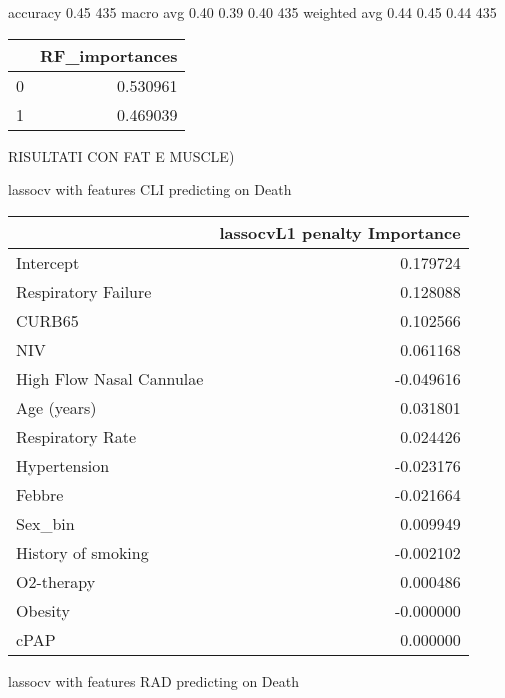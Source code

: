     accuracy                           0.45       435
   macro avg       0.40      0.39      0.40       435
weighted avg       0.44      0.45      0.44       435

\begin{tabular}{lr}
\toprule
{} &  RF\_importances \\
\midrule
0 &        0.530961 \\
1 &        0.469039 \\
\bottomrule
\end{tabular}

\large{RISULTATI CON FAT E MUSCLE)

lassocv with features CLI predicting on Death

\begin{tabular}{lr}
\toprule
{} &  lassocvL1 penalty Importance \\
\midrule
Intercept                &                      0.179724 \\
Respiratory Failure      &                      0.128088 \\
CURB65                   &                      0.102566 \\
NIV                      &                      0.061168 \\
High Flow Nasal Cannulae &                     -0.049616 \\
Age (years)              &                      0.031801 \\
Respiratory Rate         &                      0.024426 \\
Hypertension             &                     -0.023176 \\
Febbre                   &                     -0.021664 \\
Sex\_bin                  &                      0.009949 \\
History of smoking       &                     -0.002102 \\
O2-therapy               &                      0.000486 \\
Obesity                  &                     -0.000000 \\
cPAP                     &                      0.000000 \\
\bottomrule
\end{tabular}

lassocv with features RAD predicting on Death

}

